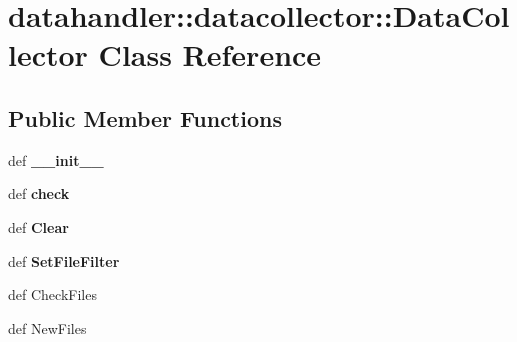 \section{datahandler::datacollector::Data\-Collector Class Reference}
\label{classdatahandler_1_1datacollector_1_1DataCollector}
\subsection*{Public Member Functions}
\begin{CompactItemize}
\item 
def \textbf{\_\-\_\-init\_\-\_\-}\label{classdatahandler_1_1datacollector_1_1DataCollector_a6771b21f3d75266a4a4e01abf358245}

\item 
def \textbf{check}\label{classdatahandler_1_1datacollector_1_1DataCollector_e51ac2e7a296d705dfd5b1d5bfbc8900}

\item 
def \textbf{Clear}\label{classdatahandler_1_1datacollector_1_1DataCollector_5d06fe73f404a724c8929515a192551c}

\item 
def \textbf{Set\-File\-Filter}\label{classdatahandler_1_1datacollector_1_1DataCollector_db783780f82e8bfe28d6cd9a781d249d}

\item 
def {\bfauto\-Check\-Files}
\item 
def {\bffind\-New\-Files}
\end{CompactItemize}
